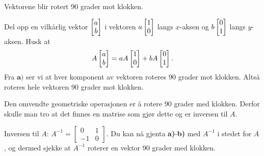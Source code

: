 \begin{losning}

\begin{punkt}

Vektorene blir rotert 90 grader mot klokken.

\begin{center}
\end{center}


\end{punkt}

\begin{punkt}
Del opp en vilkårlig vektor $\begin{bmatrix} a \\ b \end{bmatrix}$ i vektoren $a\begin{bmatrix} 1 \\ 0 \end{bmatrix}$ langs $x$-aksen og $b\begin{bmatrix} 0 \\ 1 \end{bmatrix}$ langs $y$-aksen. Husk at $$A\begin{bmatrix} a \\ b \end{bmatrix}=aA\begin{bmatrix} 1 \\ 0 \end{bmatrix}+bA\begin{bmatrix} 0 \\ 1 \end{bmatrix}.$$ Fra $\textbf{a)}$ ser vi at hver komponent av vektoren roteres 90 grader mot klokken. Altså roteres hele vektoren 90 grader mot klokken.
\end{punkt}


\begin{punkt}
Den omvendte geometriske operasjonen er å rotere 90 grader med klokken. Derfor skulle man tro at det finnes en matrise som gjør dette og er inversen til $A$.
\end{punkt}


\begin{punkt}
Inversen til $A$: $A^{-1}=\begin{bmatrix}
0 & 1\\
-1 & 0
\end{bmatrix}.$ Du kan nå gjenta \textbf{a)}-\textbf{b)} med $A^{-1}$ i stedet for $A$, og dermed sjekke at $A^{-1}$ roterer en vektor 90 grader med klokken.
\end{punkt}

\end{losning}



